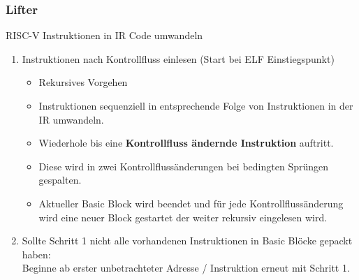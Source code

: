 \begin{frame}
    \frametitle{Lifter}{RISC-V Instruktionen in IR Code umwandeln}

    \begin{enumerate}
        \setlength\itemsep{0.5em}
        \item Instruktionen nach Kontrollfluss einlesen (Start bei ELF Einstiegspunkt)
              \begin{itemize}
                  \setlength\itemsep{0.5em}
                  \item Rekursives Vorgehen
                  \item Instruktionen sequenziell in entsprechende Folge von Instruktionen in der IR umwandeln.
                  \item Wiederhole bis eine \textbf{Kontrollfluss ändernde Instruktion} auftritt.
                  \item Diese wird in zwei Kontrollflussänderungen bei bedingten Sprüngen gespalten.
                  \item Aktueller Basic Block wird beendet und für jede Kontrollflussänderung wird eine neuer Block gestartet der weiter rekursiv eingelesen wird.
              \end{itemize}
        \item Sollte Schritt 1 nicht alle vorhandenen Instruktionen in Basic Blöcke gepackt haben:\\ Beginne ab erster unbetrachteter Adresse / Instruktion erneut mit Schritt 1.
    \end{enumerate}
\end{frame}
\clearpage

